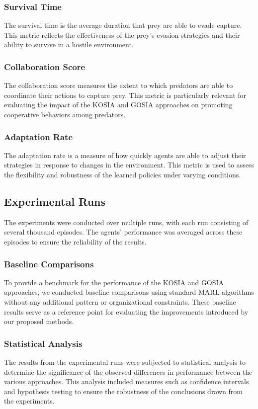 \documentclass[sn-mathphys-num]{sn-jnl}%
\theoremstyle{thmstyleone}%
\theoremstyle{thmstyletwo}%
\theoremstyle{thmstylethree}%
\begin{document}
\subsubsection{Survival Time}
The survival time is the average duration that prey are able to evade capture. This metric reflects the effectiveness of the prey's evasion strategies and their ability to survive in a hostile environment.

\subsubsection{Collaboration Score}
The collaboration score measures the extent to which predators are able to coordinate their actions to capture prey. This metric is particularly relevant for evaluating the impact of the KOSIA and GOSIA approaches on promoting cooperative behaviors among predators.

\subsubsection{Adaptation Rate}
The adaptation rate is a measure of how quickly agents are able to adjust their strategies in response to changes in the environment. This metric is used to assess the flexibility and robustness of the learned policies under varying conditions.

\subsection{Experimental Runs}
The experiments were conducted over multiple runs, with each run consisting of several thousand episodes. The agents' performance was averaged across these episodes to ensure the reliability of the results.

\subsubsection{Baseline Comparisons}
To provide a benchmark for the performance of the KOSIA and GOSIA approaches, we conducted baseline comparisons using standard MARL algorithms without any additional pattern or organizational constraints. These baseline results serve as a reference point for evaluating the improvements introduced by our proposed methods.

\subsubsection{Statistical Analysis}
The results from the experimental runs were subjected to statistical analysis to determine the significance of the observed differences in performance between the various approaches. This analysis included measures such as confidence intervals and hypothesis testing to ensure the robustness of the conclusions drawn from the experiments.
\end{document}
